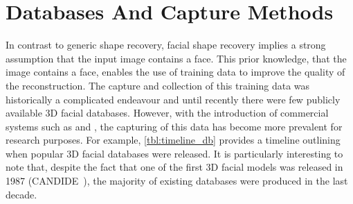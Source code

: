 \section{Databases And Capture Methods}\label{ch:bg_db_capture}
In contrast to generic shape recovery, facial shape recovery implies a strong
assumption that the input image contains a face. This prior knowledge, that the
image contains a face, enables the use of training data to improve the
quality of the reconstruction. The capture and collection of this training data
was historically a complicated endeavour and until recently there were few
publicly available 3D facial databases. However, with the introduction of 
commercial systems such as \citet{3dmd} and \citet{di4d}, the capturing
of this data has become more prevalent for research purposes. For example,
\cref{tbl:timeline_db} provides a timeline outlining when popular 3D facial
databases were released. It is particularly interesting to note that, despite
the fact that one of the first 3D facial models was released in 1987 
(CANDIDE~\cite{Rydfalk:1987tg}), the majority of existing databases were 
produced in the last decade.
